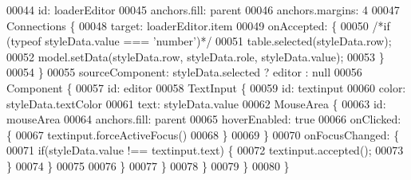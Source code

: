 \begin{DoxyCode}
00044             \textcolor{keywordtype}{id}: loaderEditor
00045             anchors.fill: parent
00046             anchors.margins: 4
00047             Connections \{
00048                 target: loaderEditor.item
00049                 onAccepted: \{
00050                     \textcolor{comment}{/*if (typeof styleData.value === 'number')*/}
00051                     table.selected(styleData.row);
00052                     model.setData(styleData.row, styleData.role, styleData.value);
00053                 \}
00054             \}
00055             sourceComponent: styleData.selected ? editor : null
00056             Component \{
00057                 \textcolor{keywordtype}{id}: editor
00058                 TextInput \{
00059                     \textcolor{keywordtype}{id}: textinput
00060                     color: styleData.textColor
00061                     text: styleData.value
00062                     MouseArea \{
00063                         \textcolor{keywordtype}{id}: mouseArea
00064                         anchors.fill: parent
00065                         hoverEnabled: \textcolor{keyword}{true}
00066                         onClicked: \{
00067                             textinput.forceActiveFocus()
00068                         \}
00069                     \}
00070                     onFocusChanged: \{
00071                         \textcolor{keywordflow}{if}(styleData.value !== textinput.text) \{
00072                             textinput.accepted();
00073                         \}
00074                     \}
00075 
00076                 \}
00077             \}
00078         \}
00079     \}
00080 \}
\end{DoxyCode}
